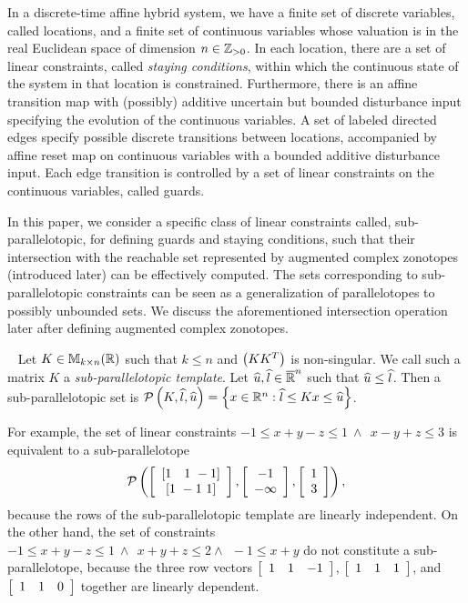 
In a discrete-time affine hybrid system, we have a finite set of
discrete variables, called locations, and a finite set of continuous
variables whose valuation is in the real Euclidean space of dimension
$n\in\mathbb{Z}_{> 0}$.  In each location, there are a set of linear constraints,
called \emph{staying conditions}, within which the continuous state of
the system in that location is constrained.  Furthermore, there is an
affine transition map with (possibly) additive uncertain but bounded
disturbance input specifying the evolution of the continuous
variables. A set of labeled directed edges specify possible discrete
transitions between locations, accompanied by affine reset map on
continuous variables with a bounded additive disturbance input. Each
edge transition is controlled by a set of linear constraints on the
continuous variables, called guards.

In this paper, we consider a specific class of linear constraints
called, sub-parallelotopic, for defining guards and staying
conditions, such that their intersection with the reachable set
represented by augmented complex zonotopes (introduced later) can be
effectively computed. The sets corresponding to sub-parallelotopic
constraints can be seen as a generalization of parallelotopes to
possibly unbounded sets.  We discuss the aforementioned intersection
operation later after defining augmented complex zonotopes.
%
\begin{definition}~\label{defn:sub-parallelotope} Let
  $K\in\mathbb{M}_{k\times n}(\mathbb{R})$ such that $k\leq n$ and $\left(KK^T\right)$ is
  non-singular.  We call such a matrix $K$ a
  \emph{sub-parallelotopic template}.  Let
  $\widehat{u},\widehat{l}\in\mathbb{\overline{R}}^n$ such that $\widehat{u}\leq\widehat{l}$.  Then
  a sub-parallelotopic set is $\mathcal{P}\left(K,\widehat{l},\widehat{u}\right) = \left\{x\in\mathbb{R}^n: \widehat{l}\leq Kx \leq \widehat{u}\right\}$.
\end{definition}
%
For example, the set of linear constraints $-1\leq x+y-z\leq
1~\wedge~~ x-y+z\leq 3$ is equivalent to a sub-parallelotope
$$\mathcal{P}\left(\left[\begin{array}{c}{\left[1~~~1~-1\right]}\\{\left[1~-1~1\right]} \end{array}\right],\left[\begin{array}{c}{-1}\\{-\infty} \end{array}\right],\left[\begin{array}{c}{1}\\{3} \end{array}\right]\right),$$
because the rows of the sub-parallelotopic template are linearly
independent.  On the other hand, the set of constraints $-1\leq
x+y-z\leq 1~\wedge~~x+y+z\leq 2\wedge~~-1\leq x+y$ do not constitute a
sub-parallelotope, because the three row vectors $\left[\begin{array}{c
c c}1 & 1 & -1\end{array}\right]$, $\left[\begin{array}{c c c}1 & 1 &
1\end{array}\right]$, and $\left[\begin{array}{c c c}1 & 1 &
0\end{array}\right]$ together are linearly dependent. 

